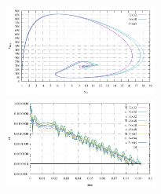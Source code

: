 \begin{center}
\includegraphics[width=5cm]{python_codes/fieldstone_03/results_1e5/Nu_vrms.pdf}\\
\includegraphics[width=5cm]{python_codes/fieldstone_03/results_1e5/convergence.pdf}\\
\end{center}

\newpage
